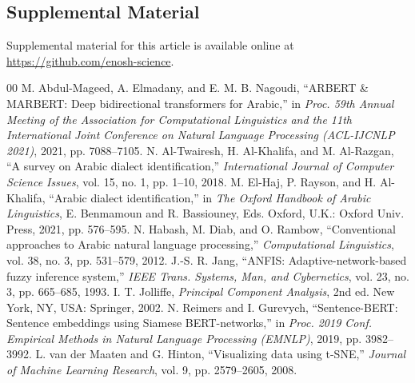 \documentclass[conference]{IEEEtran}
\begin{document}
\subsection*{Supplemental Material}
Supplemental material for this article is available online at \url{https://github.com/enosh-science}.

\begin{thebibliography}{00}
 M. Abdul-Mageed, A. Elmadany, and E. M. B. Nagoudi, ``ARBERT \& MARBERT: Deep bidirectional transformers for Arabic,'' in \textit{Proc. 59th Annual Meeting of the Association for Computational Linguistics and the 11th International Joint Conference on Natural Language Processing (ACL-IJCNLP 2021)}, 2021, pp. 7088--7105.
 N. Al-Twairesh, H. Al-Khalifa, and M. Al-Razgan, ``A survey on Arabic dialect identification,'' \textit{International Journal of Computer Science Issues}, vol. 15, no. 1, pp. 1--10, 2018.
 M. El-Haj, P. Rayson, and H. Al-Khalifa, ``Arabic dialect identification,'' in \textit{The Oxford Handbook of Arabic Linguistics}, E. Benmamoun and R. Bassiouney, Eds. Oxford, U.K.: Oxford Univ. Press, 2021, pp. 576--595.
 N. Habash, M. Diab, and O. Rambow, ``Conventional approaches to Arabic natural language processing,'' \textit{Computational Linguistics}, vol. 38, no. 3, pp. 531--579, 2012.
 J.-S. R. Jang, ``ANFIS: Adaptive-network-based fuzzy inference system,'' \textit{IEEE Trans. Systems, Man, and Cybernetics}, vol. 23, no. 3, pp. 665--685, 1993.
 I. T. Jolliffe, \textit{Principal Component Analysis}, 2nd ed. New York, NY, USA: Springer, 2002.
 N. Reimers and I. Gurevych, ``Sentence-BERT: Sentence embeddings using Siamese BERT-networks,'' in \textit{Proc. 2019 Conf. Empirical Methods in Natural Language Processing (EMNLP)}, 2019, pp. 3982--3992.
 L. van der Maaten and G. Hinton, ``Visualizing data using t-SNE,'' \textit{Journal of Machine Learning Research}, vol. 9, pp. 2579--2605, 2008.
\end{thebibliography}
\end{document}
